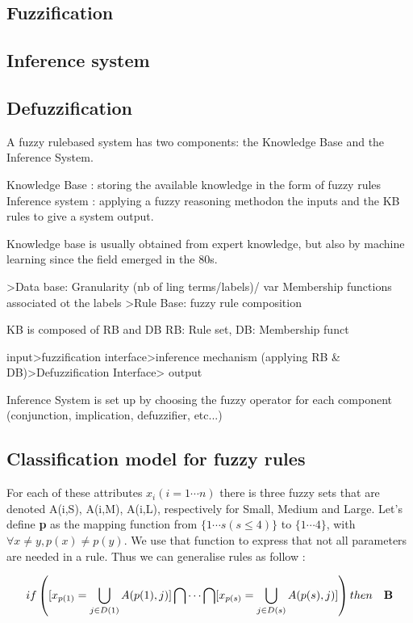 \documentclass[a4paper,12pt]{article}
\begin{document}
\subsection{Fuzzification}

\subsection{Inference system}

\subsection{Defuzzification}


A fuzzy rulebased system has two components: the Knowledge Base and the Inference System.

Knowledge Base : storing the available knowledge in the form of fuzzy rules
Inference system : applying a fuzzy reasoning methodon the inputs and the KB rules to give a system output.


Knowledge base is usually obtained from expert knowledge, but also by machine learning since the field emerged in the 80s.

>Data base:
Granularity (nb of ling terms/labels)/ var
Membership functions associated ot the labels
>Rule Base: fuzzy rule composition

KB is composed of RB and DB
RB: Rule set, DB: Membership funct

input>fuzzification interface>inference mechanism (applying RB \& DB)>Defuzzification Interface> output






Inference System is set up by choosing the fuzzy operator for each component (conjunction, implication, defuzzifier, etc...)



\subsection{Classification model for fuzzy rules}
For each of these attributes $x_{i}(i=1\cdots n)$ there is three fuzzy sets that are denoted A(i,S), A(i,M), A(i,L), respectively for Small, Medium and Large.
Let's define \textbf{p} as the mapping function from $\{1\cdots s(s\leq4)\}$ to $\{1\cdots4\}$, with $\forall x\neq y, p(x)\neq p(y)$. We use that function to express that not all parameters are needed in a rule.
Thus we can generalise rules as follow :

\[if \left( [x_{p(1)}=\bigcup_{j\in D(1)}A(p(1),j) ] \bigcap\cdots\bigcap[x_{p(s)}=\bigcup_{j\in D(s)}A(p(s),j) ] \right) then\quad \bf B \] 
\end{document}
